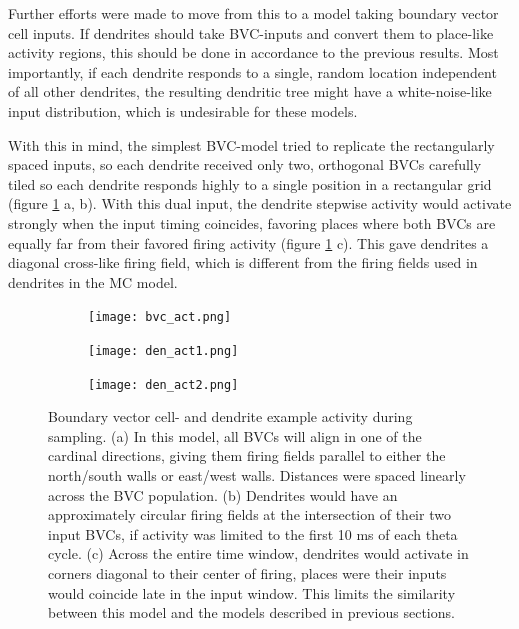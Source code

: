 \documentclass{article}
\begin{document}
    Further efforts were made to move from this to a model taking boundary vector cell inputs. If dendrites should take BVC-inputs and convert them to place-like activity regions, this should be done in accordance to the previous results. Most importantly, if each dendrite responds to a single, random location independent of all other dendrites, the resulting dendritic tree might have a white-noise-like input distribution, which is undesirable for these models.

    With this in mind, the simplest BVC-model tried to replicate the rectangularly spaced inputs, so each dendrite received only two, orthogonal BVCs carefully tiled so each dendrite responds highly to a single position in a rectangular grid (figure \ref{BVC_input} a, b). With this dual input, the dendrite stepwise activity would activate strongly when the input timing coincides, favoring places where both BVCs are equally far from their favored firing activity (figure \ref{BVC_input} c). This gave dendrites a diagonal cross-like firing field, which is different from the firing fields used in dendrites in the MC model.

    \begin{figure}[H]
        \begin{subfigure}{0.315\textwidth}
            \subcaption{}
            \texttt{[image: bvc\_act.png]}
        \end{subfigure}
        \hspace{0.02\textwidth}
        \begin{subfigure}{0.315\textwidth}
            \subcaption{}
            \texttt{[image: den\_act1.png]}
        \end{subfigure}
        \hspace{0.02\textwidth}
        \begin{subfigure}{0.315\textwidth}
            \subcaption{}
            \texttt{[image: den\_act2.png]}
        \end{subfigure}
        \caption{Boundary vector cell- and dendrite example activity during sampling. (a) In this model, all BVCs will align in one of the cardinal directions, giving them firing fields parallel to either the north/south walls or east/west walls. Distances were spaced linearly across the BVC population. (b) Dendrites would have an approximately circular firing fields at the intersection of their two input BVCs, if activity was limited to the first 10 ms of each theta cycle. (c) Across the entire time window, dendrites would activate in corners diagonal to their center of firing, places were their inputs would coincide late in the input window. This limits the similarity between this model and the models described in previous sections.}
        \label{BVC_input}
    \end{figure}
    
\end{document}
